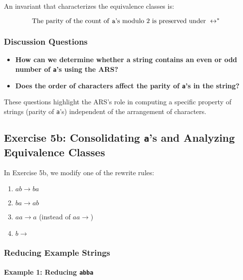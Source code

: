 \documentclass{article}
\begin{document}
An invariant that characterizes the equivalence classes is:

\begin{equation*}
    \text{The parity of the count of \texttt{a}'s modulo 2 is preserved under }\leftrightarrow^*
\end{equation*}

\subsubsection*{Discussion Questions}

\begin{itemize}
    \item \textbf{How can we determine whether a string contains an even or odd number of \texttt{a}'s using the ARS?}
    \item \textbf{Does the order of characters affect the parity of \texttt{a}'s in the string?}
\end{itemize}

These questions highlight the ARS's role in computing a specific property of strings (parity of \texttt{a}'s) independent of the arrangement of characters.

\subsection*{Exercise 5b: Consolidating \texttt{a}'s and Analyzing Equivalence Classes}

In Exercise 5b, we modify one of the rewrite rules:

\begin{enumerate}
    \item $ab \to ba$
    \item $ba \to ab$
    \item $aa \to a$ (instead of $aa \to$)
    \item $b \to$
\end{enumerate}

\subsubsection*{Reducing Example Strings}

\paragraph{Example 1: Reducing \texttt{abba}}
\end{document}

